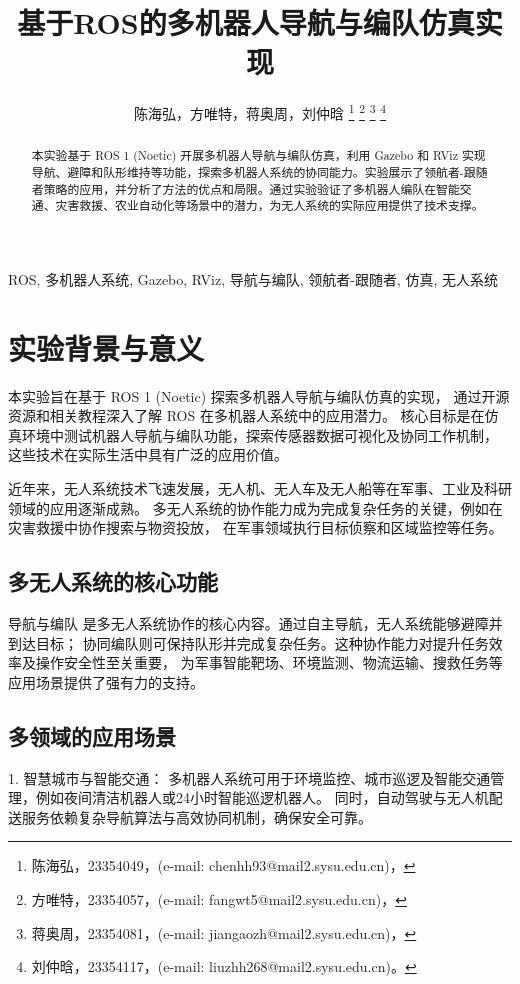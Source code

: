 \documentclass[journal,twoside,web]{ieeecolor}
\begin{document}
\title{基于ROS的多机器人导航与编队仿真实现}
\author{陈海弘，方唯特，蒋奥周，刘仲晗
\thanks{陈海弘，23354049，(e-mail: chenhh93@mail2.sysu.edu.cn)，}
\thanks{方唯特，23354057，(e-mail: fangwt5@mail2.sysu.edu.cn)，}
\thanks{蒋奥周，23354081，(e-mail: jiangaozh@mail2.sysu.edu.cn)，}
\thanks{刘仲晗，23354117，(e-mail: liuzhh268@mail2.sysu.edu.cn)。}
}

\maketitle

\begin{abstract}
本实验基于 ROS 1 (Noetic) 开展多机器人导航与编队仿真，利用 Gazebo 和 RViz 实现导航、避障和队形维持等功能，探索多机器人系统的协同能力。实验展示了领航者-跟随者策略的应用，并分析了方法的优点和局限。通过实验验证了多机器人编队在智能交通、灾害救援、农业自动化等场景中的潜力，为无人系统的实际应用提供了技术支撑。%
\end{abstract}

\begin{IEEEkeywords}
ROS, 多机器人系统, Gazebo, RViz, 导航与编队, 领航者-跟随者, 仿真, 无人系统%
\end{IEEEkeywords}
\section{实验背景与意义}
本实验旨在基于 ROS 1 (Noetic) 探索多机器人导航与编队仿真的实现，
通过开源资源和相关教程深入了解 ROS 在多机器人系统中的应用潜力。
核心目标是在仿真环境中测试机器人导航与编队功能，探索传感器数据可视化及协同工作机制，
这些技术在实际生活中具有广泛的应用价值。

近年来，无人系统技术飞速发展，无人机、无人车及无人船等在军事、工业及科研领域的应用逐渐成熟。
多无人系统的协作能力成为完成复杂任务的关键，例如在灾害救援中协作搜索与物资投放，
在军事领域执行目标侦察和区域监控等任务。

\subsection*{多无人系统的核心功能}
导航与编队 是多无人系统协作的核心内容。通过自主导航，无人系统能够避障并到达目标；
协同编队则可保持队形并完成复杂任务。这种协作能力对提升任务效率及操作安全性至关重要，
为军事智能靶场、环境监测、物流运输、搜救任务等应用场景提供了强有力的支持。

\subsection*{多领域的应用场景}
	1.	智慧城市与智能交通：
多机器人系统可用于环境监控、城市巡逻及智能交通管理，例如夜间清洁机器人或24小时智能巡逻机器人。
同时，自动驾驶与无人机配送服务依赖复杂导航算法与高效协同机制，确保安全可靠。
	
\end{document}
